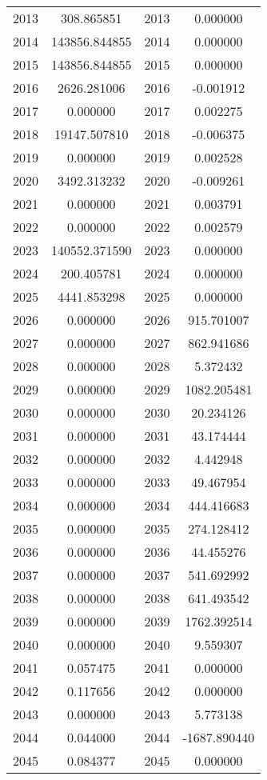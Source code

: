 \documentclass[12pt]{article}
\begin{document}
\begin{longtable}{@{}cccc@{}}
2013 & 308.865851 & 2013 & 0.000000 \\
2014 & 143856.844855 & 2014 & 0.000000 \\
2015 & 143856.844855 & 2015 & 0.000000 \\
2016 & 2626.281006 & 2016 & -0.001912 \\
2017 & 0.000000 & 2017 & 0.002275 \\
2018 & 19147.507810 & 2018 & -0.006375 \\
2019 & 0.000000 & 2019 & 0.002528 \\
2020 & 3492.313232 & 2020 & -0.009261 \\
2021 & 0.000000 & 2021 & 0.003791 \\
2022 & 0.000000 & 2022 & 0.002579 \\
2023 & 140552.371590 & 2023 & 0.000000 \\
2024 & 200.405781 & 2024 & 0.000000 \\
2025 & 4441.853298 & 2025 & 0.000000 \\
2026 & 0.000000 & 2026 & 915.701007 \\
2027 & 0.000000 & 2027 & 862.941686 \\
2028 & 0.000000 & 2028 & 5.372432 \\
2029 & 0.000000 & 2029 & 1082.205481 \\
2030 & 0.000000 & 2030 & 20.234126 \\
2031 & 0.000000 & 2031 & 43.174444 \\
2032 & 0.000000 & 2032 & 4.442948 \\
2033 & 0.000000 & 2033 & 49.467954 \\
2034 & 0.000000 & 2034 & 444.416683 \\
2035 & 0.000000 & 2035 & 274.128412 \\
2036 & 0.000000 & 2036 & 44.455276 \\
2037 & 0.000000 & 2037 & 541.692992 \\
2038 & 0.000000 & 2038 & 641.493542 \\
2039 & 0.000000 & 2039 & 1762.392514 \\
2040 & 0.000000 & 2040 & 9.559307 \\
2041 & 0.057475 & 2041 & 0.000000 \\
2042 & 0.117656 & 2042 & 0.000000 \\
2043 & 0.000000 & 2043 & 5.773138 \\
2044 & 0.044000 & 2044 & -1687.890440 \\
2045 & 0.084377 & 2045 & 0.000000 \\

\end{longtable}
\end{document}
